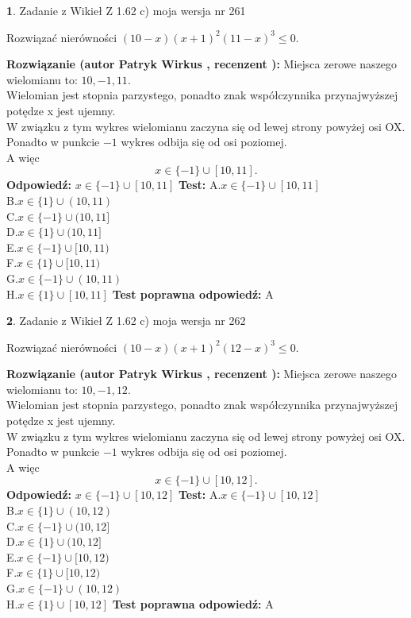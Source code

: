 \documentclass[12pt, a4paper]{article}
\theoremstyle{definition} %
\newtheorem{zad}{}
\newcommand{\zadStart}[1]{\begin{zad}#1\newline}
\newcommand{\zadStop}{\end{zad}}
\newcommand{\rozwStart}[2]{\noindent \textbf{Rozwiązanie (autor #1 , recenzent #2): }\newline}
\newcommand{\rozwStop}{\newline}
\newcommand{\odpStart}{\noindent \textbf{Odpowiedź:}\newline}
\newcommand{\odpStop}{\newline}
\newcommand{\testStart}{\noindent \textbf{Test:}\newline}
\newcommand{\testStop}{\newline}
\newcommand{\kluczStart}{\noindent \textbf{Test poprawna odpowiedź:}\newline}
\newcommand{\kluczStop}{\newline}
\begin{document}
\zadStart{Zadanie z Wikieł Z 1.62 c) moja wersja nr 261}

Rozwiązać nierówności $(10-x)(x+1)^{2}(11-x)^{3}\le0$.
\zadStop
\rozwStart{Patryk Wirkus}{}
Miejsca zerowe naszego wielomianu to: $10, -1, 11$.\\
Wielomian jest stopnia parzystego, ponadto znak współczynnika przy\linebreak najwyższej potędze x jest ujemny.\\ W związku z tym wykres wielomianu zaczyna się od lewej strony powyżej osi OX.\\
Ponadto w punkcie $-1$ wykres odbija się od osi poziomej.\\
A więc $$x \in \{-1\} \cup [10,11].$$
\rozwStop
\odpStart
$x \in \{-1\} \cup [10,11]$
\odpStop
\testStart
A.$x \in \{-1\} \cup [10,11]$\\
B.$x \in \{1\} \cup (10,11)$\\
C.$x \in \{-1\} \cup (10,11]$\\
D.$x \in \{1\} \cup (10,11]$\\
E.$x \in \{-1\} \cup [10,11)$\\
F.$x \in \{1\} \cup [10,11)$\\
G.$x \in \{-1\} \cup (10,11)$\\
H.$x \in \{1\} \cup [10,11]$
\testStop
\kluczStart
A
\kluczStop



\zadStart{Zadanie z Wikieł Z 1.62 c) moja wersja nr 262}

Rozwiązać nierówności $(10-x)(x+1)^{2}(12-x)^{3}\le0$.
\zadStop
\rozwStart{Patryk Wirkus}{}
Miejsca zerowe naszego wielomianu to: $10, -1, 12$.\\
Wielomian jest stopnia parzystego, ponadto znak współczynnika przy\linebreak najwyższej potędze x jest ujemny.\\ W związku z tym wykres wielomianu zaczyna się od lewej strony powyżej osi OX.\\
Ponadto w punkcie $-1$ wykres odbija się od osi poziomej.\\
A więc $$x \in \{-1\} \cup [10,12].$$
\rozwStop
\odpStart
$x \in \{-1\} \cup [10,12]$
\odpStop
\testStart
A.$x \in \{-1\} \cup [10,12]$\\
B.$x \in \{1\} \cup (10,12)$\\
C.$x \in \{-1\} \cup (10,12]$\\
D.$x \in \{1\} \cup (10,12]$\\
E.$x \in \{-1\} \cup [10,12)$\\
F.$x \in \{1\} \cup [10,12)$\\
G.$x \in \{-1\} \cup (10,12)$\\
H.$x \in \{1\} \cup [10,12]$
\testStop
\kluczStart
A
\kluczStop
\end{document}
